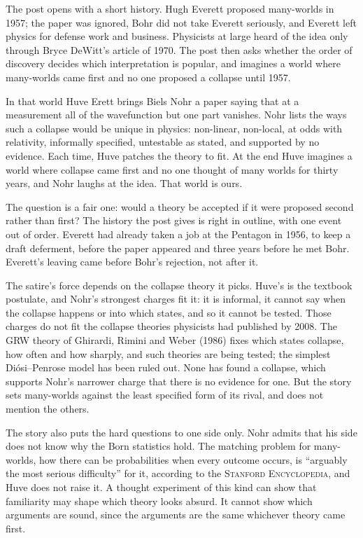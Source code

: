 \begin{afterword}
\summaryhead

The post opens with a short history. Hugh Everett proposed many-worlds in 1957; the paper was ignored, Bohr did not take Everett seriously, and Everett left physics for defense work and business. Physicists at large heard of the idea only through Bryce DeWitt's article of 1970. The post then asks whether the order of discovery decides which interpretation is popular, and imagines a world where many-worlds came first and no one proposed a collapse until 1957.

In that world Huve Erett brings Biels Nohr a paper saying that at a measurement all of the wavefunction but one part vanishes. Nohr lists the ways such a collapse would be unique in physics: non-linear, non-local, at odds with relativity, informally specified, untestable as stated, and supported by no evidence. Each time, Huve patches the theory to fit. At the end Huve imagines a world where collapse came first and no one thought of many worlds for thirty years, and Nohr laughs at the idea. That world is ours.

\responsehead

The question is a fair one: would a theory be accepted if it were proposed second rather than first? The history the post gives is right in outline, with one event out of order. Everett had already taken a job at the Pentagon in 1956, to keep a draft deferment, before the paper appeared and three years before he met Bohr. Everett's leaving came before Bohr's rejection, not after it.

The satire's force depends on the collapse theory it picks. Huve's is the textbook postulate, and Nohr's strongest charges fit it: it is informal, it cannot say when the collapse happens or into which states, and so it cannot be tested. Those charges do not fit the collapse theories physicists had published by 2008. The GRW theory of Ghirardi, Rimini and Weber (1986) fixes which states collapse, how often and how sharply, and such theories are being tested; the simplest Diósi--Penrose model has been ruled out. None has found a collapse, which supports Nohr's narrower charge that there is no evidence for one. But the story sets many-worlds against the least specified form of its rival, and does not mention the others.

The story also puts the hard questions to one side only. Nohr admits that his side does not know why the Born statistics hold. The matching problem for many-worlds, how there can be probabilities when every outcome occurs, is ``arguably the most serious difficulty'' for it, according to the \textsc{Stanford Encyclopedia}, and Huve does not raise it. A thought experiment of this kind can show that familiarity may shape which theory looks absurd. It cannot show which arguments are sound, since the arguments are the same whichever theory came first.


\end{afterword}
